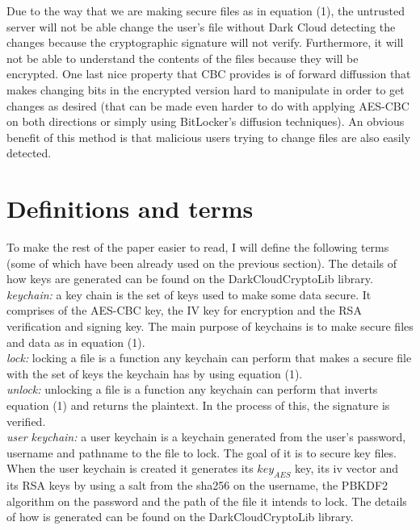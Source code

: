 \documentclass[a4paper]{article}
\begin{document}
    Due to the way that we are making secure files as in equation (1), the untrusted server will not be able change the user's file without Dark Cloud detecting the changes because the cryptographic signature will not verify. Furthermore, it will not be able to understand the contents of the files because they will be encrypted. One last nice property that CBC provides is of forward diffussion that makes changing bits in the encrypted version hard to manipulate in order to get changes as desired (that can be made even harder to do with applying AES-CBC on both directions or simply using BitLocker's diffusion techniques). An obvious benefit of this method is that malicious users trying to change files are also easily detected. 

\section{Definitions and terms}

To make the rest of the paper easier to read, I will define the following terms (some of which have been already used on the previous section). The details of how keys are generated can be found on the DarkCloudCryptoLib library.\\

{\it keychain:} a key chain is the set of keys used to make some data secure. It comprises of the AES-CBC key, the IV key for encryption and the RSA verification and signing key. The main purpose of keychains is to make secure files and data as in equation (1).\\

{\it lock:} locking a file is a function any keychain can perform that makes a secure file with the set of keys the keychain has by using equation (1).\\

{\it unlock:} unlocking a file is a function any keychain can perform that inverts equation (1) and returns the plaintext. In the process of this, the signature is verified.\\ 

{\it user keychain:} a user keychain is a keychain generated from the user's password, username and pathname to the file to lock. The goal of it is to secure key files. When the user keychain is created it generates its $key_{AES}$ key, its iv vector and its RSA keys by using a salt from the sha256 on the username, the PBKDF2 algorithm on the password and the path of the file it intends to lock. The details of how is generated can be found on the DarkCloudCryptoLib library.\\
\end{document}
